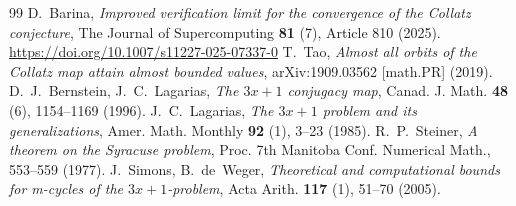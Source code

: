 \documentclass[11pt,reqno]{amsart}
\theoremstyle{definition}
\theoremstyle{remark}
\numberwithin{equation}{section}
\begin{document}
\begin{center}
\end{center}

\begin{thebibliography}{99}
 D.~Barina, \emph{Improved verification limit for the convergence of the Collatz conjecture}, The Journal of Supercomputing \textbf{81} (7), Article 810 (2025). \url{https://doi.org/10.1007/s11227-025-07337-0}
 T.~Tao, \emph{Almost all orbits of the Collatz map attain almost bounded values}, arXiv:1909.03562 [math.PR] (2019).
 D.~J.~Bernstein, J.~C.~Lagarias, \emph{The $3x+1$ conjugacy map}, Canad. J. Math. \textbf{48} (6), 1154--1169 (1996).
 J.~C.~Lagarias, \emph{The $3x+1$ problem and its generalizations}, Amer. Math. Monthly \textbf{92} (1), 3--23 (1985).
 R.~P.~Steiner, \emph{A theorem on the Syracuse problem}, Proc. 7th Manitoba Conf. Numerical Math., 553--559 (1977).
 J.~Simons, B.~de~Weger, \emph{Theoretical and computational bounds for m-cycles of the $3x+1$-problem}, Acta Arith. \textbf{117} (1), 51--70 (2005).
\end{thebibliography}
\end{document}

